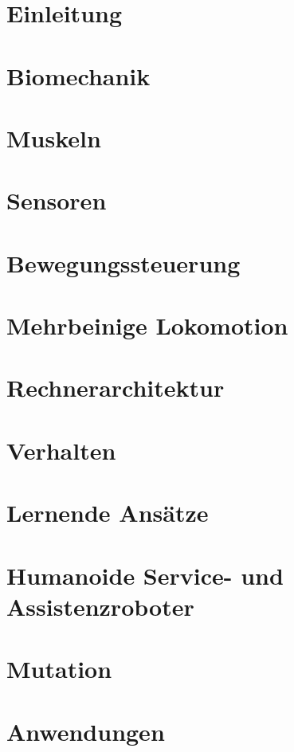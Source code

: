 \documentclass[11pt]{scrartcl}
\begin{document}
\section{Einleitung} %


\section{Biomechanik} %


\section{Muskeln}


\section{Sensoren}


\section{Bewegungssteuerung}


\section{Mehrbeinige Lokomotion}


\section{Rechnerarchitektur}


\section{Verhalten}


\section{Lernende Ansätze}


\section{Humanoide Service- und Assistenzroboter}


\section{Mutation}


\section{Anwendungen}

\end{document}
